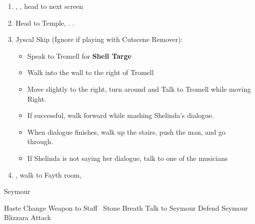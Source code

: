 \begin{enumerate}[resume]
    \item \sd, \cs[0:40], head to next screen
    \item Head to Temple, \sd. \save.
    \wincb
    \item Jyscal Skip (Ignore if playing with Cutscene Remover):
    \begin{itemize}
        \item Speak to Tromell for \textbf{Shell Targe}
        \item Walk into the wall to the right of Tromell
        \item Move slightly to the right, turn around and Talk to Tromell while moving Right.
        \item If successful, walk forward while mashing Shelinda's dialogue.
        \item When dialogue finishes, walk up the stairs, push the man, and go through.
        \item If Shelinda is not saying her dialogue, talk to one of the musicians
    \end{itemize}
    \item \sd, walk to Fayth room, \cs[2:10]
\end{enumerate}
\bothvfill
\begin{battle}[3000]{Seymour}
    \begin{itemize}
        \tidusf Haste \tidus
        \yunaf Change Weapon to Staff
        \kimahrif \od\ Stone Breath
        \tidusf Talk to Seymour
        \switch{\yuna}{\auron}
        \auronf Defend
        \enemyf Seymour Blizzara
        \tidusf Attack
    \end{itemize}
\end{battle}
\bothvfill
\lossvfill
